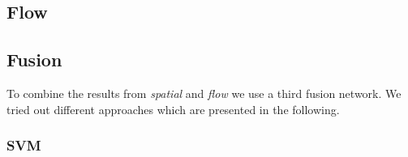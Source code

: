\subsection{Flow}
\label{subsec:flow}



\subsection{Fusion}
\label{subsec:fusion}

To combine the results from \emph{spatial} and \emph{flow} we use a third fusion network.
We tried out different approaches which are presented in the following.

\subsubsection{SVM}


